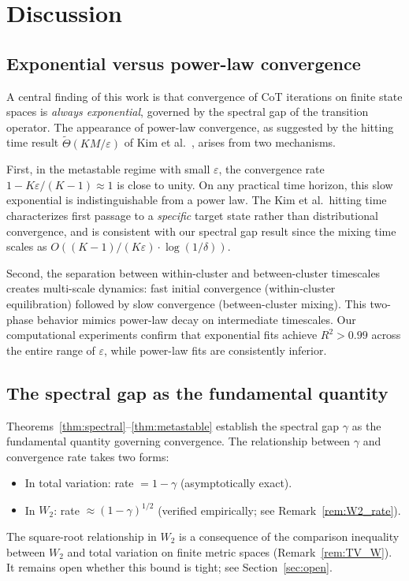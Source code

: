 \section{Discussion}\label{sec:discussion}

\subsection{Exponential versus power-law convergence}

A central finding of this work is that convergence of CoT iterations on finite
state spaces is \emph{always exponential}, governed by the spectral gap of the
transition operator. The appearance of power-law convergence, as suggested by the
hitting time result $\widetilde{\Theta}(KM/\varepsilon)$ of Kim et al.\
\cite{kim2025metastable}, arises from two mechanisms.

First, in the metastable regime with small $\varepsilon$, the convergence rate
$1 - K\varepsilon/(K-1) \approx 1$ is close to unity. On any practical time
horizon, this slow exponential is indistinguishable from a power law. The Kim
et al.\ hitting time characterizes first passage to a \emph{specific} target
state rather than distributional convergence, and is consistent with our
spectral gap result since the mixing time scales as
$O((K-1)/(K\varepsilon) \cdot \log(1/\delta))$.

Second, the separation between within-cluster and between-cluster timescales
creates multi-scale dynamics: fast initial convergence (within-cluster
equilibration) followed by slow convergence (between-cluster mixing). This
two-phase behavior mimics power-law decay on intermediate timescales. Our
computational experiments confirm that exponential fits achieve $R^2 > 0.99$
across the entire range of $\varepsilon$, while power-law fits are consistently
inferior.

\subsection{The spectral gap as the fundamental quantity}

Theorems~\ref{thm:spectral}--\ref{thm:metastable} establish the spectral gap
$\gamma$ as the fundamental quantity governing convergence. The relationship
between $\gamma$ and convergence rate takes two forms:
\begin{itemize}[leftmargin=*]
\item In total variation: rate $= 1 - \gamma$ (asymptotically exact).
\item In $W_2$: rate $\approx (1 - \gamma)^{1/2}$
  (verified empirically; see Remark~\ref{rem:W2_rate}).
\end{itemize}
The square-root relationship in $W_2$ is a consequence of the comparison
inequality between $W_2$ and total variation on finite metric spaces
(Remark~\ref{rem:TV_W}). It remains open whether this bound is tight; see
Section~\ref{sec:open}.

